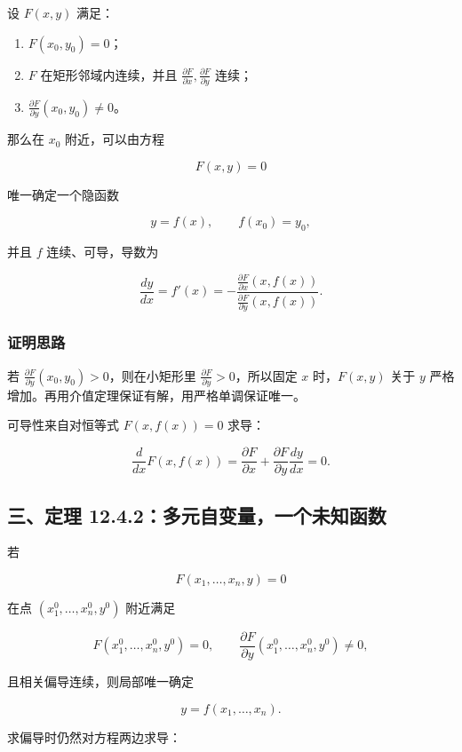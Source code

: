 设 \(F(x,y)\) 满足：

\begin{enumerate}
 \item \(F(x_0,y_0)=0\)；
 \item \(F\) 在矩形邻域内连续，并且 \(\frac{\partial F}{\partial x},\frac{\partial F}{\partial y}\) 连续；
 \item \(\frac{\partial F}{\partial y}(x_0,y_0)\ne0\)。
 \end{enumerate}

那么在 \(x_0\) 附近，可以由方程

\[
      F(x,y)=0
    \]

唯一确定一个隐函数

\[
      y=f(x),\qquad f(x_0)=y_0,
    \]

并且 \(f\) 连续、可导，导数为

\[
      \frac{dy}{dx}
      =
      f'(x)
      =
      -\frac{\frac{\partial F}{\partial x}(x,f(x))}
      {\frac{\partial F}{\partial y}(x,f(x))}.
    \]

\subsubsection*{证明思路}

若 \(\frac{\partial F}{\partial y}(x_0,y_0)>0\)，则在小矩形里 \(\frac{\partial F}{\partial y}>0\)，所以固定 \(x\) 时，\(F(x,y)\) 关于 \(y\) 严格增加。再用介值定理保证有解，用严格单调保证唯一。

可导性来自对恒等式 \(F(x,f(x))=0\) 求导：

\[
      \frac{d}{dx}F(x,f(x))
      =
      \frac{\partial F}{\partial x}
      +
      \frac{\partial F}{\partial y}\frac{dy}{dx}
      =
      0.
    \]

\subsection*{三、定理 12.4.2：多元自变量，一个未知函数}

若

\[
      F(x_1,\ldots,x_n,y)=0
    \]

在点 \((x_1^0,\ldots,x_n^0,y^0)\) 附近满足

\[
      F(x_1^0,\ldots,x_n^0,y^0)=0,\qquad
      \frac{\partial F}{\partial y}(x_1^0,\ldots,x_n^0,y^0)\ne0,
    \]

且相关偏导连续，则局部唯一确定

\[
      y=f(x_1,\ldots,x_n).
    \]

求偏导时仍然对方程两边求导：

